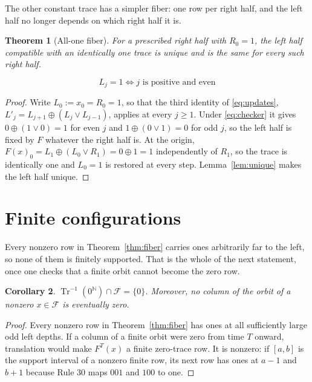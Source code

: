\documentclass[11pt]{article}
\newtheorem{theorem}{Theorem}
\newtheorem{corollary}[theorem]{Corollary}
\newcommand{\F}{\mathcal F}
\newcommand{\Tr}{\operatorname{Tr}}
\begin{document}
The other constant trace has a simpler fiber: one row per right half, and the
left half no longer depends on which right half it is.

\begin{theorem}[All-one fiber]\label{thm:onefiber}
For a prescribed right half with $R_0=1$, the left half compatible with an
identically one trace is unique and is the same for every such right half.

\begin{equation}\label{eq:checker}
 L_j=1\iff j\text{ is positive and even}
\end{equation}
\end{theorem}
\begin{proof}
Write $L_0:=x_0=R_0=1$, so that the third identity of \eqref{eq:updates},
$L'_j=L_{j+1}\oplus(L_j\lor L_{j-1})$, applies at every $j\geq1$.  Under
\eqref{eq:checker} it gives $0\oplus(1\lor0)=1$ for even $j$ and
$1\oplus(0\lor1)=0$ for odd $j$, so the left half is fixed by $F$ whatever the
right half is.  At the origin, $F(x)_0=L_1\oplus(L_0\lor R_1)=0\oplus1=1$
independently of $R_1$, so the trace is identically one and $L_0=1$ is restored
at every step.  Lemma~\ref{lem:unique} makes the left half unique.
\end{proof}


\section{Finite configurations}\label{sec:finite}

Every nonzero row in Theorem~\ref{thm:fiber} carries ones arbitrarily far to
the left, so none of them is finitely supported.  That is the whole of the next
statement, once one checks that a finite orbit cannot become the zero row.

\begin{corollary}\label{cor:finite}
$\Tr^{-1}(0^{\mathbb N})\cap\F=\{0\}$.  Moreover, no column of the orbit of a
nonzero $x\in\F$ is eventually zero.
\end{corollary}
\begin{proof}
Every nonzero row in Theorem~\ref{thm:fiber} has ones at all sufficiently
large odd left depths.  If a column of a finite orbit were zero from time
$T$ onward, translation would make $F^T(x)$ a finite zero-trace row.  It is
nonzero: if $[a,b]$ is the support interval of a nonzero finite row, its next
row has ones at $a-1$ and $b+1$ because Rule 30 maps $001$ and $100$ to one.
\end{proof}
\end{document}

